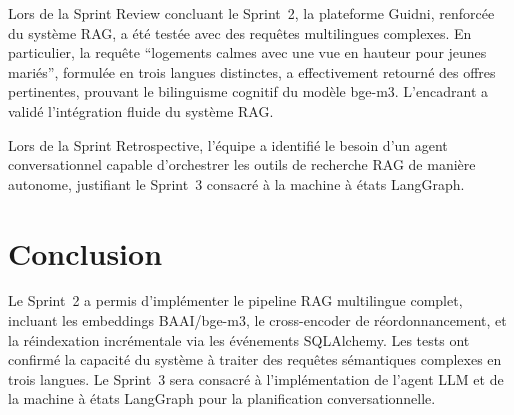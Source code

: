 Lors de la Sprint Review concluant le Sprint~2, la plateforme Guidni, renforcée du système RAG,
a été testée avec des requêtes multilingues complexes. En particulier, la requête
\enquote{logements calmes avec une vue en hauteur pour jeunes mariés}, formulée en trois
langues distinctes, a effectivement retourné des offres pertinentes, prouvant le bilinguisme
cognitif du modèle bge-m3. L'encadrant a validé l'intégration fluide du système RAG.

Lors de la Sprint Retrospective, l'équipe a identifié le besoin d'un agent conversationnel
capable d'orchestrer les outils de recherche RAG de manière autonome, justifiant le Sprint~3
consacré à la machine à états LangGraph.


\section*{Conclusion}

Le Sprint~2 a permis d'implémenter le pipeline RAG multilingue complet, incluant les
embeddings BAAI/bge-m3, le cross-encoder de réordonnancement, et la réindexation incrémentale
via les événements SQLAlchemy. Les tests ont confirmé la capacité du système à traiter des
requêtes sémantiques complexes en trois langues. Le Sprint~3 sera consacré à l'implémentation
de l'agent LLM et de la machine à états LangGraph pour la planification conversationnelle.
